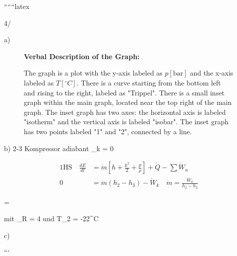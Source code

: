 
``````latex

4/

a)

\begin{figure}[h]
\centering
\begin{minipage}{0.5\textwidth}
\centering
\textbf{Verbal Description of the Graph:}

The graph is a plot with the y-axis labeled as $p[\text{bar}]$ and the x-axis labeled as $T[^\circ C]$. There is a curve starting from the bottom left and rising to the right, labeled as "Trippel". There is a small inset graph within the main graph, located near the top right of the main graph. The inset graph has two axes: the horizontal axis is labeled "isotherm" and the vertical axis is labeled "isobar". The inset graph has two points labeled "1" and "2", connected by a line.
\end{minipage}
\end{figure}

b) 2-3 Kompressor adiabant \quad {}_k = 0

\begin{align*}
\text{1HS} \quad \frac{dE}{dt} &= \dot{m} \left[ h + \frac{k^2}{2} + \frac{p}{\rho} \right] + \dot{Q} - \sum \dot{W}_u \\
0 &= \dot{m} (h_2 - h_3) - \dot{W}_k \quad \dot{m} = \frac{\dot{W}_k}{h_2 - h_3}
\end{align*}

 =

mit \quad {}_R = 4  \quad und \quad T_2 = -22^\circ C

c)

```